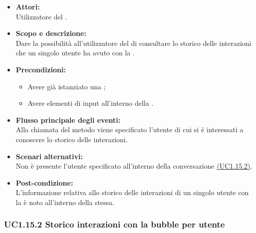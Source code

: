 \begin{itemize}
	\item \textbf{Attori:}
	\\Utilizzatore del .
	\item \textbf{Scopo e descrizione:} 
	\\Dare la possibilità all'utilizzatore del  di consultare lo storico delle interazioni che un singolo utente ha avuto con la .
	\item \textbf{Precondizioni:}
	\begin{itemize}
		\item Avere già istanziato una ;
		\item Avere elementi di input all'interno della .
	\end{itemize}
	\item \textbf{Flusso principale degli eventi:}
	\\Alla chiamata del metodo viene specificato l'utente di cui si è interessati a conoscere lo storico delle interazioni.
	\item \textbf{Scenari alternativi:}
	\\Non è presente l'utente specificato all'interno della conversazione \hyperref[UC1.15.2]{(UC1.15.2)}.
	\item \textbf{Post-condizione:}
	\\L'informazione relativa allo storico delle interazioni di un singolo utente con la  è noto all'interno della  stessa.
\end{itemize}

\subsubsection{UC1.15.2 Storico interazioni con la bubble per utente} \label{UC1.15.2}

